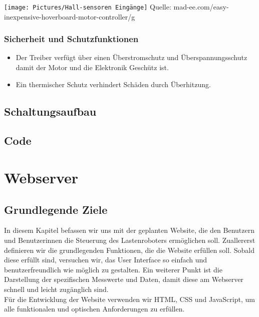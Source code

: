 \documentclass[ngerman,12pt,a4paper]{article}
\begin{document}
		\begin{minipage}{\textwidth}
			\centering
			\texttt{[image: Pictures/Hall-sensoren Eingänge]}
			\label{fig:spiffs_init}
			\vspace{-2pt}
			\small Quelle: mad-ee.com/easy-inexpensive-hoverboard-motor-controller/g
		\end{minipage}
		
		\subsubsection*{Sicherheit und Schutzfunktionen}
		\begin{itemize}
			\item Der Treiber verfügt über einen Überstromschutz und Überspannungsschutz damit der Motor und die Elektronik Geschütz ist.
			\item Ein thermischer Schutz verhindert Schäden durch Überhitzung.
		\end{itemize}
		
		\subsection{Schaltungsaufbau} %
		
		\subsection{Code} %
\newpage
	\section{Webserver} %
	 
		\subsection{Grundlegende Ziele}
	In diesem Kapitel befassen wir uns mit der geplanten Website, die den Benutzern und Benutzerinnen die Steuerung des Lastenroboters ermöglichen soll. Zuallererst definieren wir die grundlegenden Funktionen, die die Website erfüllen soll. Sobald diese erfüllt sind, versuchen wir, das User Interface so einfach und benutzerfreundlich wie möglich zu gestalten. Ein weiterer Punkt ist die Darstellung der spezifischen Messwerte und Daten, damit diese am Webserver schnell und leicht zugänglich sind.\\[0.5cm]
	Für die Entwicklung der Website verwenden wir HTML, CSS und JavaScript, um alle funktionalen und optischen Anforderungen zu erfüllen.  
	
\end{document}

